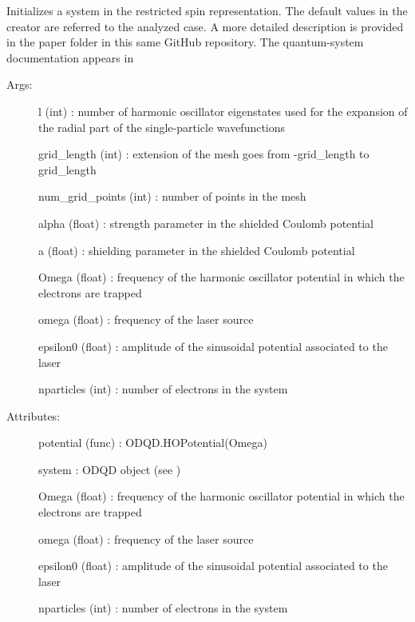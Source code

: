 \documentclass[letterpaper,10pt,english]{sphinxmanual}
\begin{document}
\begin{fulllineitems}
\label{\detokenize{index:do.RHF}}
Initializes a system in the restricted spin representation. The default values in the creator are referred to the analyzed case.
A more detailed description is provided in the paper folder in this same GitHub repository.
The quantum-system documentation appears in 
\begin{description}
\item[{Args:}] \leavevmode
l (int) : number of harmonic oscillator eigenstates used for the expansion of the radial part of the single-particle wavefunctions

grid\_length (int) : extension of the mesh goes from -grid\_length to grid\_length

num\_grid\_points (int) : number of points in the mesh

alpha (float) : strength parameter in the shielded Coulomb potential

a (float) : shielding parameter in the shielded Coulomb potential

Omega (float) : frequency of the harmonic oscillator potential in which the electrons are trapped

omega (float) : frequency of the laser source

epsilon0 (float) : amplitude of the sinusoidal potential associated to the laser

nparticles (int) : number of electrons in the system

\item[{Attributes:}] \leavevmode
potential (func) : ODQD.HOPotential(Omega)

system : ODQD object (see )

Omega (float) : frequency of the harmonic oscillator potential in which the electrons are trapped

omega (float) : frequency of the laser source

epsilon0 (float) : amplitude of the sinusoidal potential associated to the laser

nparticles (int) : number of electrons in the system


\end{description}
\end{fulllineitems}
\end{document}
